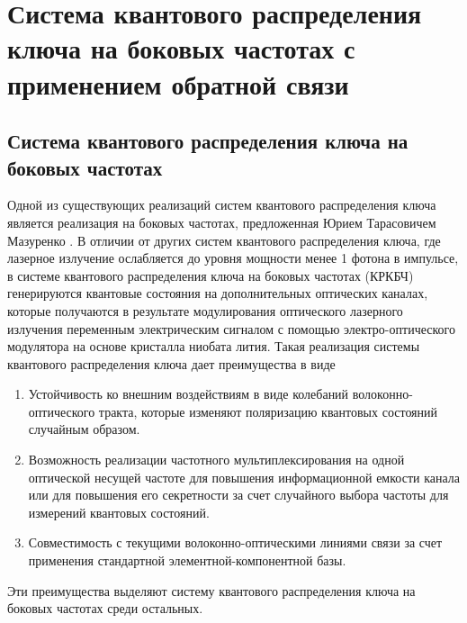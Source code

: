 \chapter{Система квантового распределения ключа на боковых частотах с применением обратной связи}\label{ch:ch2}
\renewcommand{\thefigure}{2.\arabic{figure}} %
\setcounter{figure}{0}                     %


\section{Система квантового распределения ключа на боковых частотах}\label{sec:ch2/sect9}
Одной из существующих реализаций систем квантового распределения ключа является реализация на боковых частотах, предложенная Юрием Тарасовичем Мазуренко \cite{gleim2016}. 
В отличии от других систем квантового распределения ключа, где лазерное излучение ослабляется до уровня мощности менее 1 фотона в импульсе, в системе квантового распределения ключа на боковых частотах (КРКБЧ) \cite{gleim2016} генерируются квантовые состояния на дополнительных оптических каналах, которые получаются в результате модулирования 
оптического лазерного излучения переменным электрическим сигналом с помощью электро-оптического модулятора на основе кристалла ниобата лития.
Такая реализация системы квантового распределения ключа дает преимущества в виде
\begin{enumerate}
    \item Устойчивость ко внешним воздействиям в виде колебаний волоконно-оптического тракта, которые изменяют поляризацию квантовых состояний случайным образом.
    \item Возможность реализации частотного мультиплексирования на одной оптической несущей частоте для повышения информационной емкости канала или для повышения его секретности за счет случайного выбора частоты для измерений квантовых состояний.
    \item Совместимость с текущими волоконно-оптическими линиями связи за счет применения стандартной элементной-компонентной базы. 
\end{enumerate}
Эти преимущества выделяют систему квантового распределения ключа на боковых частотах среди остальных.
